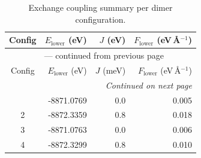 
\begin{longtable}{@{}crrr@{}}
\caption{Exchange coupling summary per dimer configuration.}
\label{tab:exchange_couplings}\\
\toprule
Config & $E_{\mathrm{lower}}$ (eV) & $J$ (eV) & $F_{\mathrm{lower}}$ (eV\,\AA$^{-1}$)\\
\midrule
\endfirsthead
\multicolumn{4}{c}{{\tablename}~\thetable{} --- continued from previous page}\\
\toprule
Config & $E_{\mathrm{lower}}$ (eV) & $J$ (meV) & $F_{\mathrm{lower}}$ (eV\,\AA$^{-1}$)\\
\midrule
\endhead
\midrule
\multicolumn{4}{r}{\emph{Continued on next page}}\\
\endfoot
\bottomrule
\endlastfoot
1 & -8871.0769 & 0.0 & 0.005 \\ 
2 & -8872.3359 & 0.8 & 0.018 \\ 
3 & -8871.0763 & 0.0 & 0.006 \\ 
4 & -8872.3299 & 0.8 & 0.010 \\ 
\end{longtable}